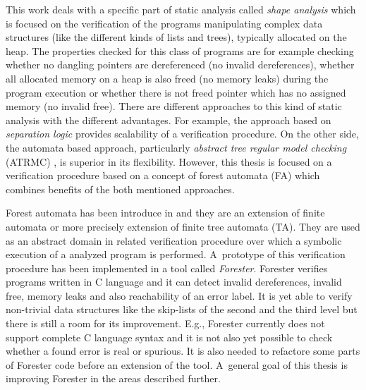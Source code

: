 \documentclass[fleqn,11pt]{ExcelAtFIT} %
\begin{document}
This work deals with a specific part of static analysis called \emph{shape analysis} which is focused on the verification of the programs manipulating
complex data structures (like the different kinds of lists and trees), typically allocated on the heap.
The properties checked for this class of programs are for example checking whether no dangling
pointers are dereferenced (no invalid dereferences), whether all allocated memory on a heap is also freed (no memory leaks)
during the program execution or whether there is not freed pointer which has no assigned memory (no invalid free).
There are different approaches to this kind of static analysis with the different advantages.
For example, the approach based on \emph{separation logic} \cite{seplog,seplog07} provides scalability of a verification procedure.
On the other side, the automata based approach, particularly \emph{abstract tree regular model checking} (ATRMC) \cite{artmc}, is
superior in its flexibility.
However, this thesis is focused on a verification procedure based on a concept of forest automata (FA) which
combines benefits of the both mentioned approaches.

Forest automata has been introduce in \cite{forester11,forester12} and they are an extension of finite automata or more precisely extension of finite tree automata (TA).
They are used as an abstract domain in related verification procedure over which a symbolic execution of a analyzed program is performed.
A~prototype of this verification procedure has been implemented in a tool called \emph{Forester}.
Forester verifies programs written in C language and it can detect invalid dereferences, invalid free, memory leaks and also reachability of an error label.
It is yet able to verify non-trivial data structures like the skip-lists of the second and the third level
but there is still a room for its improvement.
E.g., Forester currently does not support complete C language syntax and
it is not also yet possible to check whether a found error is real or spurious.
It is also needed to refactore some parts of Forester code before an extension of the tool.
A~general goal of this thesis is improving Forester in the areas described further.
\end{document}
